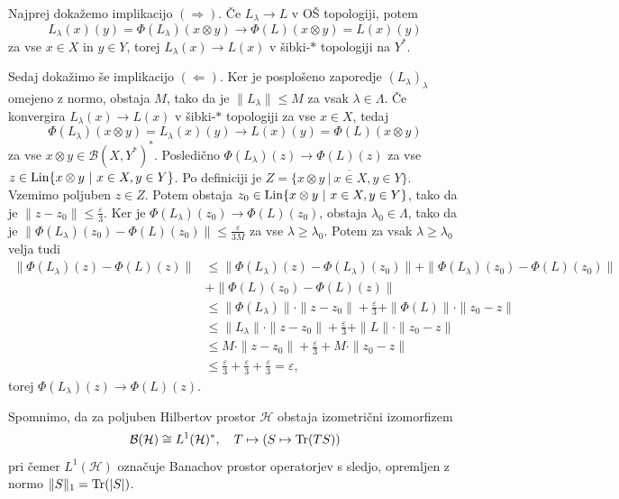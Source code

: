 \begin{dokaz}
    Najprej dokažemo implikacijo $(\Rightarrow)$. Če $L_\lambda \to L$ v OŠ topologiji, potem 
    $$L_\lambda (x) (y) = \Phi (L_\lambda) (x \otimes y) \to \Phi (L) (x \otimes y) = L(x) (y)$$
    za vse $x \in X$ in $y \in Y$, torej $L_\lambda (x) \to L (x)$ v šibki-$*$ topologiji na $Y^*$. 
    
    Sedaj dokažimo še implikacijo $(\Leftarrow)$. Ker je posplošeno zaporedje $(L_\lambda)_\lambda$ omejeno z normo, obstaja $M$, tako da je $\| L_\lambda \| \leq M$ za vsak $\lambda \in \Lambda$.
    Če konvergira $L_\lambda (x) \xrightarrow{} L(x)$ v šibki-$*$ topologiji za vse $x \in X$, tedaj
    $$\Phi (L_\lambda) (x \otimes y) = L_\lambda (x) (y) \to L(x) (y) = \Phi (L) (x \otimes y)$$
    za vse $x \otimes y \in \mathcal{B}(X, Y^*)^*$. Posledično $\Phi (L_\lambda)(z) \to \Phi(L) (z)$ za vse $z \in \operatorname{Lin} \{x \otimes y\ |\ x \in X, y \in Y\}$. 
    Po definiciji je $Z = \overline{\{x \otimes y\ |\ x \in X, y \in Y\}}$. Vzemimo poljuben $z \in Z$.
    Potem obstaja $z_0 \in \lin \{x \otimes y\ |\ x \in X, y \in Y\}$, tako da je $\| z - z_0 \| \leq \frac{\varepsilon}{3}$.
    Ker je $\Phi (L_\lambda) (z_0) \to \Phi (L) (z_0)$, obstaja $\lambda_0 \in \Lambda$,
    tako da je $\| \Phi (L_\lambda) (z_0) - \Phi (L) (z_0)\| \leq \frac{\varepsilon}{3M}$ za vse $\lambda \geq \lambda_0$. Potem za vsak $\lambda \geq \lambda_0$ velja tudi 
    \begin{align*}
        \| \Phi (L_\lambda) (z) - \Phi (L) (z)\| &\leq \| \Phi (L_\lambda) (z) - \Phi (L_\lambda) (z_0)\| + \| \Phi (L_\lambda) (z_0) - \Phi (L) (z_0)\|\\
         &+ \|  \Phi (L) (z_0) - \Phi (L) (z)\|\\
        &\leq \| \Phi (L_\lambda) \| \cdot \| z - z_0\| + \frac{\varepsilon}{3} + \| \Phi (L) \| \cdot  \| z_0 - z\|\\
        &\leq \| L_\lambda \| \cdot \| z - z_0\| + \frac{\varepsilon}{3} + \| L \| \cdot  \| z_0 - z\|\\
        &\leq M \cdot \| z - z_0\| + \frac{\varepsilon}{3} + M \cdot  \| z_0 - z\|\\
        &\leq \frac{\varepsilon}{3} + \frac{\varepsilon}{3} + \frac{\varepsilon}{3} = \varepsilon,
    \end{align*}
    torej $\Phi (L_\lambda) (z) \to \Phi (L) (z)$.
\end{dokaz}

Spomnimo, da za poljuben Hilbertov prostor $\mathcal{H}$ obstaja izometrični izomorfizem  
$$\operatorname{\mathcal{B} (\mathcal{H})} \cong L^1 (\mathcal{H})^*,\quad T \mapsto (S \mapsto \operatorname{Tr}(TS))$$
pri čemer $L^1 (\mathcal{H})$ označuje Banachov prostor operatorjev s sledjo, opremljen z normo $\| S \|_1 = \operatorname{Tr} (|S|)$.

